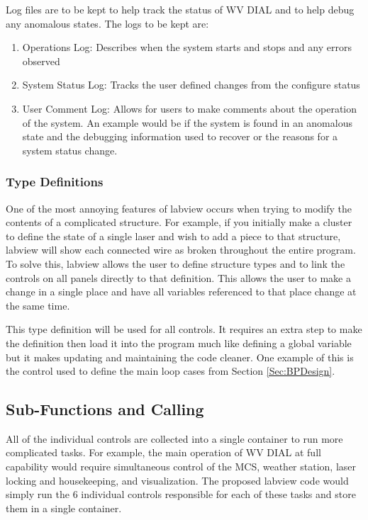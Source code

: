 Log files are to be kept to help track the status of WV DIAL and to help debug any anomalous states. The logs to be kept are:

\begin{enumerate}
\item{Operations Log: Describes when the system starts and stops and any errors observed}
\item{System Status Log: Tracks the user defined changes from the configure status}
\item{User Comment Log: Allows for users to make comments about the operation of the system. An example would be if the system is found in an anomalous state and the debugging information used to recover or the reasons for a system status change. }
\end{enumerate}

\subsubsection{Type Definitions}

One of the most annoying features of labview occurs when trying to modify the contents of a complicated structure. For example, if you initially make a cluster to define the state of a single laser and wish to add a piece to that structure, labview will show each connected wire as broken throughout the entire program. To solve this, labview allows the user to define structure types and to link the controls on all panels directly to that definition. This allows the user to make a change in a single place and have all variables referenced to that place change at the same time. 

This type definition will be used for all controls. It requires an extra step to make the definition then load it into the program much like defining a global variable but it makes updating and maintaining the code cleaner. One example of this is the control used to define the main loop cases from Section \ref{Sec:BPDesign}.

\subsection{Sub-Functions and Calling}

All of the individual controls are collected into a single container to run more complicated tasks. For example, the main operation of WV DIAL at full capability would require simultaneous control of the MCS, weather station, laser locking and housekeeping, and visualization. The proposed labview code would simply run the 6 individual controls responsible for each of these tasks and store them in a single container. 

